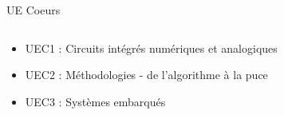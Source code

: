 \documentclass[t,compress,mathserif,12pt,xcolor=dvipsnames]{beamer}
\begin{document}
\begin{frame}[t]{UE Coeurs}
  \begin{minipage}[t][5.0cm][t]{\textwidth}
    \begin{columns}[T]
      \begin{column}{0.63\textwidth}
        \begin{itemize}
            \item<+-> UEC1 : Circuits intégrés numériques et analogiques
            \item<+-> UEC2 : Méthodologies - de l’algorithme à la puce
            \item<+-> UEC3 : Systèmes embarqués
        \end{itemize}
      \end{column}
      \begin{column}{0.04\textwidth}


\end{column}
\end{columns}
\end{minipage}
\end{frame}
\end{document}
